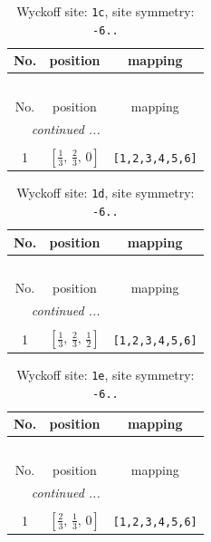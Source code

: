 \documentclass[fleqn,8pt]{jsarticle}
\begin{document}
\begin{longtable}{ccc}
\caption{Wyckoff site: {\tt 1c}, site symmetry: {\tt -6..}}
 \\
 \hline \hline
No. & position & mapping \\ \hline \endfirsthead

\multicolumn{2}{l}{\tablename\ \thetable{}} \\
 \hline \hline
No. & position & mapping \\ \hline \endhead

 \hline \hline
\multicolumn{2}{r}{\footnotesize\it continued ...} \\ \endfoot

 \hline \hline
\multicolumn{2}{r}{} \\ \endlastfoot

1 & $\left[ \frac{1}{3},\, \frac{2}{3},\, 0 \right]$ & {\tt [1,2,3,4,5,6]} \\
\end{longtable}
\renewcommand{\arraystretch}{1.2}
\begin{longtable}{ccc}
\caption{Wyckoff site: {\tt 1d}, site symmetry: {\tt -6..}}
 \\
 \hline \hline
No. & position & mapping \\ \hline \endfirsthead

\multicolumn{2}{l}{\tablename\ \thetable{}} \\
 \hline \hline
No. & position & mapping \\ \hline \endhead

 \hline \hline
\multicolumn{2}{r}{\footnotesize\it continued ...} \\ \endfoot

 \hline \hline
\multicolumn{2}{r}{} \\ \endlastfoot

1 & $\left[ \frac{1}{3},\, \frac{2}{3},\, \frac{1}{2} \right]$ & {\tt [1,2,3,4,5,6]} \\
\end{longtable}
\renewcommand{\arraystretch}{1.2}
\begin{longtable}{ccc}
\caption{Wyckoff site: {\tt 1e}, site symmetry: {\tt -6..}}
 \\
 \hline \hline
No. & position & mapping \\ \hline \endfirsthead

\multicolumn{2}{l}{\tablename\ \thetable{}} \\
 \hline \hline
No. & position & mapping \\ \hline \endhead

 \hline \hline
\multicolumn{2}{r}{\footnotesize\it continued ...} \\ \endfoot

 \hline \hline
\multicolumn{2}{r}{} \\ \endlastfoot

1 & $\left[ \frac{2}{3},\, \frac{1}{3},\, 0 \right]$ & {\tt [1,2,3,4,5,6]} \\
\end{longtable}
\end{document}
